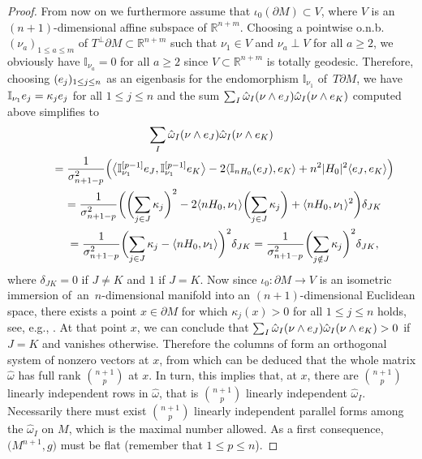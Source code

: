 \documentclass[11pt]{article}
\numberwithin{equation}{section}
\numberwithin{equation}{section}
\begin{document}
\begin{proof}
From now on we furthermore assume that $\iota_0(\partial M)\subset V$, where $V$ is an $(n+1)$-dimensional affine subspace of $\mathbb{R}^{n+m}$.
Choosing a pointwise o.n.b.\ $(\nu_a)_{1\leq a\leq m}$ of $T^\perp\partial M\subset\mathbb{R}^{n+m}$ such that $\nu_1\in V$ and $\nu_a\perp V$ for all $a\geq2$, we obviously have $\mathbb{I}_{\nu_a}=0$ for all $a\geq2$ since $V\subset\mathbb{R}^{n+m}$ is totally geodesic. Therefore, choosing $({\rm e}_j)_{1\leq j\leq n}$ as an eigenbasis for the endomorphism $\mathbb{I}_{\nu_1}$ of~$T\partial M$, we have $\mathbb{I}_{\nu_1}{\rm e}_j=\kappa_j {\rm e}_j$ for all $1\leq j\leq n$ and the sum $\sum_I\hat{\omega}_I(\nu\wedge {\rm e}_J)\hat{\omega}_I(\nu\wedge {\rm e}_K)$ computed above simplifies to
\begin{gather*}
\sum_I\hat{\omega}_I(\nu\wedge {\rm e}_J)\hat{\omega}_I(\nu\wedge {\rm e}_K)\\
\qquad{}=\frac{1}{\sigma_{n+1-p}^2}\Big(\bigl\langle \mathbb{I}_{\nu_1}^{[p-1]}{\rm e}_J,\mathbb{I}_{\nu_1}^{[p-1]}{\rm e}_K\bigr\rangle
-2\langle\mathbb{I}_{nH_0}({\rm e}_J),{\rm e}_K\rangle+n^2|H_0|^2\langle {\rm e}_J,{\rm e}_K\rangle\Big)\\
\qquad{}=\frac{1}{\sigma_{n+1-p}^2}\biggl(\biggl(\sum_{j\in J}\kappa_j\biggr)^2-2\langle nH_0,\nu_1\rangle\biggl(\sum_{j\in J}\kappa_j\biggr)+\langle nH_0,\nu_1\rangle^2\biggr)\delta_{JK}\\
\qquad{}=\frac{1}{\sigma_{n+1-p}^2}\biggl(\sum_{j\in J}\kappa_j-\langle nH_0,\nu_1\rangle\biggr)^2\delta_{JK}
=\frac{1}{\sigma_{n+1-p}^2}\biggl(\sum_{j\notin J}\kappa_j\biggr)^2\delta_{JK},
\end{gather*}
where $\delta_{JK}=0$ if $J\neq K$ and $1$ if $J=K$. Now since $\iota_0\colon \partial M\to V$ is an isometric immersion of~an~$n$-dimensional manifold into an $(n+1)$-dimensional Euclidean space, there exists a point $x\in\partial M$ for which $\kappa_j(x)>0$ for all $1\leq j\leq n$ holds, see, e.g., \cite[p.~255]{GallotHulinLafontaine04}. At that point $x$, we can conclude that $\sum_I\hat{\omega}_I(\nu\wedge {\rm e}_J)\hat{\omega}_I(\nu\wedge {\rm e}_K)>0$ if $J=K$ and vanishes otherwise.
Therefore the columns of  form an orthogonal system of nonzero vectors at $x$, from which can be deduced that the whole matrix $\hat{\omega}$ has full rank $\binom{n+1}{p}$ at $x$. In turn, this implies that, at $x$, there are $\binom{n+1}{p}$ linearly independent rows in $\hat{\omega}$, that is $\binom{n+1}{p}$ linearly independent $\hat{\omega}_I$. Necessarily there must exist $\binom{n+1}{p}$ linearly independent parallel forms among the $\hat{\omega}_I$ on $M$, which is the maximal number allowed. As a first consequence, $\bigl(M^{n+1},g\bigr)$ must be flat (remember that $1\leq p\leq n$).

\end{proof}
\end{document}
